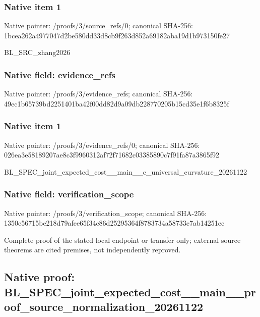 \documentclass[10pt,a4paper]{article}
\begin{document}
\subsubsection{Native item 1}


Native pointer: /proofs/3/source\_refs/0; canonical SHA-256: 1bcea262a4977047d2be580d\allowbreak{}d33d8cb9f263d852a69182ab\allowbreak{}a19d1b973150fe27


BL\_SRC\_zhang2026


\subsubsection{Native field: evidence\_refs}


Native pointer: /proofs/3/evidence\_refs; canonical SHA-256: 49ec1b65739bd2251401ba42\allowbreak{}f00dd82d9a09db228770205b\allowbreak{}15cd35e1f6b8325f



\subsubsection{Native item 1}


Native pointer: /proofs/3/evidence\_refs/0; canonical SHA-256: 026ea3e58189207ae8c3f996\allowbreak{}0312af72f71682c03385890c\allowbreak{}7f91fa87a3865f92


BL\_SPEC\_joint\_expected\_c\allowbreak{}ost\_\_main\_\_e\_universal\_c\allowbreak{}urvature\_20261122


\subsubsection{Native field: verification\_scope}


Native pointer: /proofs/3/verification\_scope; canonical SHA-256: 1350e56715be218d79afee65\allowbreak{}f34c86d25295364f8783734a\allowbreak{}58733c7ab14251ec


Complete proof of the stated local endpoint or transfer only; external source theorems are cited premises, not independently reproved.


\subsection{Native proof: BL\_SPEC\_joint\_expected\_c\allowbreak{}ost\_\_main\_\_proof\_source\_\allowbreak{}normalization\_20261122}
\end{document}
